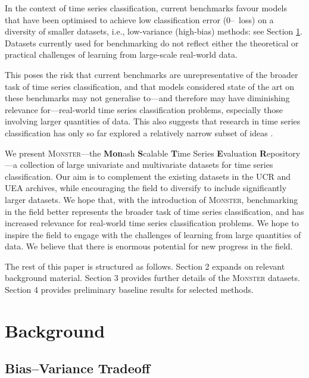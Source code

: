 \documentclass[twoside,11pt,preprint]{article}
\newcommand{\monster}{\textsc{Monster}}
\newcommand{\zo}{\mbox{0--\!1}~loss}
\begin{document}
In the context of time series classification, current benchmarks favour models that have been optimised to achieve low classification error ({\zo}) on a diversity of smaller datasets, i.e., low-variance (high-bias) methods: see Section \ref{sec-background}. Datasets currently used for benchmarking do not reflect either the theoretical or practical challenges of learning from large-scale real-world data.

This poses the risk that current benchmarks are unrepresentative of the broader task of time series classification, and that models considered state of the art on these benchmarks may not generalise to---and therefore may have diminishing relevance for---real-world time series classification problems, especially those involving larger quantities of data. This also suggests that research in time series classification has only so far explored a relatively narrow subset of ideas \citep[see][]{hooker_2021}.

We present {\monster}---the \textbf{Mon}ash \textbf{S}calable \textbf{T}ime Series \textbf{E}valuation \textbf{R}epository---a collection of large univariate and multivariate datasets for time series classification. Our aim is to complement the existing datasets in the UCR and UEA archives, while encouraging the field to diversify to include significantly larger datasets. We hope that, with the introduction of {\monster}, benchmarking in the field better represents the broader task of time series classification, and has increased relevance for real-world time series classification problems. We hope to inspire the field to engage with the challenges of learning from large quantities of data. We believe that there is enormous potential for new progress in the field.

The rest of this paper is structured as follows. Section 2 expands on relevant background material. Section 3 provides further details of the {\monster} datasets. Section 4 provides preliminary baseline results for selected methods.


\section{Background} \label{sec-background}

\subsection{Bias--Variance Tradeoff}
\end{document}
